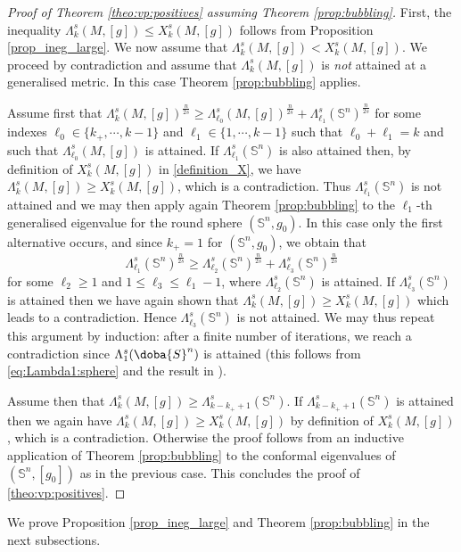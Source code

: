 \documentclass[10pt]{amsart}
\numberwithin{equation}{section}
\def\La{{\Lambda}}
\gdef\mS{\doba{S}}
\theoremstyle{plain}
\theoremstyle{remark}
\begin{document}
\begin{proof}[Proof of Theorem \ref{theo:vp:positives} assuming Theorem \ref{prop:bubbling}]
First, the inequality $\Lambda_k^s(M,[g]) \le X_k^s(M,[g])$ follows from Proposition \ref{prop_ineg_large}. We now assume that $\Lambda_k^s(M,[g]) < X_k^s(M,[g])$. We proceed by contradiction and assume that $\La_k^s(M,[g])$ is \emph{not} attained at a generalised metric. In this case Theorem \ref{prop:bubbling} applies.

Assume first that $\La_k^s(M,[g])^{\frac{n}{2s}} \ge  \La_{\ell_0}^s(M,[g])^{\frac{n}{2s}}  + \La_{\ell_1}^s(\mathbb{S}^n)^{\frac{n}{2s}}$ for some indexes $\ell_0 \in \{k_+, \cdots, k-1\}$ and $\ell_1 \in \{1, \cdots, k-1\}$ such that $\ell_0 + \ell_1 = k$ and such that $\Lambda_{\ell_0}^s(M,[g])$ is attained. If  $\La_{\ell_1}^s(\mathbb{S}^n)$ is also attained then, by definition of $X_k^s(M,[g])$ in \eqref{definition_X}, we have $\La_k^s(M,[g]) \ge X_k^s(M,[g])$, which is a contradiction. Thus $\La_{\ell_1}^s(\mathbb{S}^n)$ is not attained and we may then apply again Theorem \ref{prop:bubbling} to the $\ell_1$-th generalised eigenvalue for the round sphere $(\mathbb{S}^n,g_0)$. In this case only the first alternative occurs, and since $k_+=1$ for $(\mathbb{S}^n, g_0)$, we obtain that
$$ \La_{\ell_1}^s(\mathbb{S}^n)^{\frac{n}{2s}} \ge  \La_{\ell_2}^s(\mathbb{S}^n)^{\frac{n}{2s}}  + \La_{\ell_3}^s(\mathbb{S}^n)^{\frac{n}{2s}} $$
for some $\ell_2 \ge 1$ and $1 \le \ell_3 \le \ell_1-1$, where $ \La_{\ell_2}^s(\mathbb{S}^n)$ is attained. If $\La_{\ell_3}^s(\mathbb{S}^n)$ is attained then we have again shown that $\La_k^s(M,[g]) \ge X_k^s(M,[g])$ which leads to a contradiction. Hence $\La_{\ell_3}^s(\mathbb{S}^n)$ is not attained. We may thus repeat this argument by induction: after a finite number of iterations, we reach a contradiction since $\Lambda_1^s(\mS^n)$ is attained (this follows from \eqref{eq:Lambda1:sphere} and the result in \cite{LiebSharpConstants}). 

Assume then that $\La_k^s(M,[g]) \ge  \La_{k-{k_+}+1}^s(\mathbb{S}^n)$. If $\La_{k-{k_+}+1}^s(\mathbb{S}^n)$ is attained then we again have $\La_k^s(M,[g]) \ge X_k^s(M,[g])$ by definition of $X_k^s(M,[g])$, which is a contradiction. Otherwise the proof follows from an inductive application of Theorem \ref{prop:bubbling} to the conformal eigenvalues of $(\mathbb{S}^n, [g_0])$ as in the previous case. This concludes the proof of \ref{theo:vp:positives}. 
\end{proof}

\noindent We prove Proposition \ref{prop_ineg_large} and Theorem \ref{prop:bubbling} in the next subsections.
\end{document}
